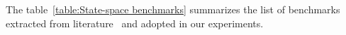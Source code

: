 \documentclass[runningheads,a4paper]{llncs}
\begin{document}
The table~\ref{table:State-space benchmarks} summarizes the list of benchmarks extracted from literature~\cite{Franklin15,converters,maglev,CTMS} and adopted in our experiments.

%
\end{document}

